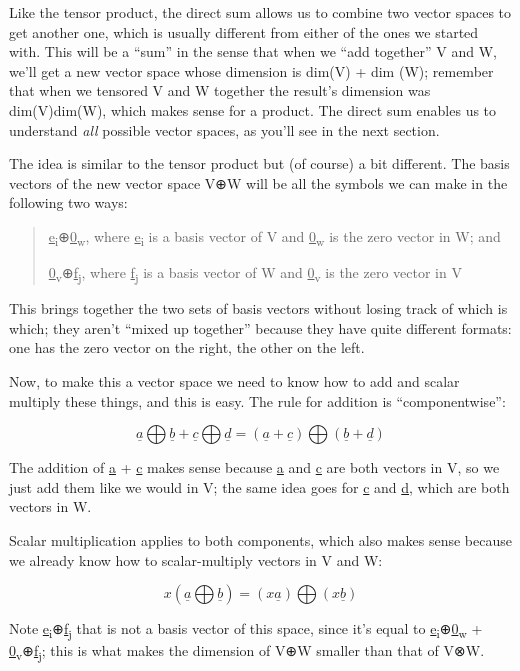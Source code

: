 \documentclass[oneside,english]{amsbook}
\numberwithin{section}{chapter}
\theoremstyle{plain}
\theoremstyle{definition}
\begin{document}
Like the tensor product, the direct sum allows us to combine two vector
spaces to get another one, which is usually different from either of the
ones we started with. This will be a ``sum'' in the sense that when we
``add together'' V and W, we'll get a new vector space whose dimension
is dim(V) + dim (W); remember that when we tensored V and W together the
result's dimension was dim(V)dim(W), which makes sense for a product.
The direct sum enables us to understand \emph{all} possible vector
spaces, as you'll see in the next section.

The idea is similar to the tensor product but (of course) a bit
different. The basis vectors of the new vector space V⊕W will be all the
symbols we can make in the following two ways:

\begin{quote}
	\ul{e}\textsubscript{i}⊕\ul{0}\textsubscript{w}, where
	\ul{e}\textsubscript{i} is a basis vector of V and
	\ul{0}\textsubscript{w} is the zero vector in W; and
	
	\ul{0}\textsubscript{v}⊕\ul{f}\textsubscript{j}, where
	\ul{f}\textsubscript{j} is a basis vector of W and
	\ul{0}\textsubscript{v} is the zero vector in V
\end{quote}

This brings together the two sets of basis vectors without losing track
of which is which; they aren't ``mixed up together'' because they have
quite different formats: one has the zero vector on the right, the other
on the left.

Now, to make this a vector space we need to know how to add and scalar
multiply these things, and this is easy. The rule for addition is
``componentwise'':

\[\underline{a}\bigoplus\underline{b} + \underline{c}\bigoplus\underline{d} = (\underline{a} + \underline{c})\bigoplus(\underline{b} + \underline{d})\]

The addition of \ul{a} + \ul{c} makes sense because \ul{a} and \ul{c}
are both vectors in V, so we just add them like we would in V; the same
idea goes for \ul{c} and \ul{d}, which are both vectors in W.

Scalar multiplication applies to both components, which also makes sense
because we already know how to scalar-multiply vectors in V and W:

\[x\left( \underline{a}\bigoplus\underline{b} \right) = (x\underline{a})\bigoplus(x\underline{b})\]

Note \ul{e}\textsubscript{i}⊕\ul{f}\textsubscript{j} that is not a basis
vector of this space, since it's equal to
\ul{e}\textsubscript{i}⊕\ul{0}\textsubscript{w} +
\ul{0}\textsubscript{v}⊕\ul{f}\textsubscript{j}; this is what makes the
dimension of V⊕W smaller than that of V⊗W.
\end{document}
